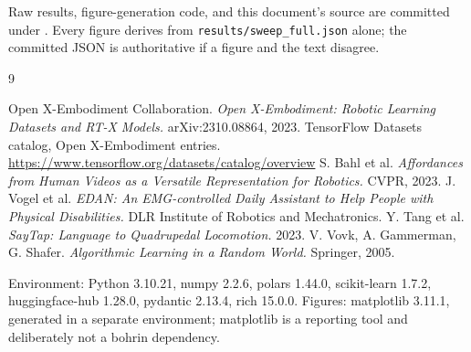 \documentclass[10pt,a4paper]{article}
\newcommand{\dtr}[1]{\texttt{\small #1}}
\begin{document}
Raw results, figure-generation code, and this document's source are committed under
. Every figure derives from
\dtr{results/sweep\_full.json} alone; the committed JSON is authoritative if a figure and
the text disagree.

\begin{thebibliography}{9}
\raggedright
{} Open X-Embodiment Collaboration. \emph{Open X-Embodiment: Robotic Learning
Datasets and RT-X Models.} arXiv:2310.08864, 2023.
 TensorFlow Datasets catalog, Open X-Embodiment entries.
\url{https://www.tensorflow.org/datasets/catalog/overview}
 S. Bahl et al. \emph{Affordances from Human Videos as a Versatile
Representation for Robotics.} CVPR, 2023.
 J. Vogel et al. \emph{EDAN: An EMG-controlled Daily Assistant to Help People
with Physical Disabilities.} DLR Institute of Robotics and Mechatronics.
 Y. Tang et al. \emph{SayTap: Language to Quadrupedal Locomotion.} 2023.
 V. Vovk, A. Gammerman, G. Shafer. \emph{Algorithmic Learning in a Random
World.} Springer, 2005.
\end{thebibliography}

\vspace{0.4em}
\noindent\textcolor{ink}{\footnotesize Environment: Python 3.10.21, numpy 2.2.6,
polars 1.44.0, scikit-learn 1.7.2, huggingface-hub 1.28.0, pydantic 2.13.4, rich 15.0.0.
Figures: matplotlib 3.11.1, generated in a separate environment; matplotlib is a reporting
tool and deliberately not a bohrin dependency.}
\end{document}
